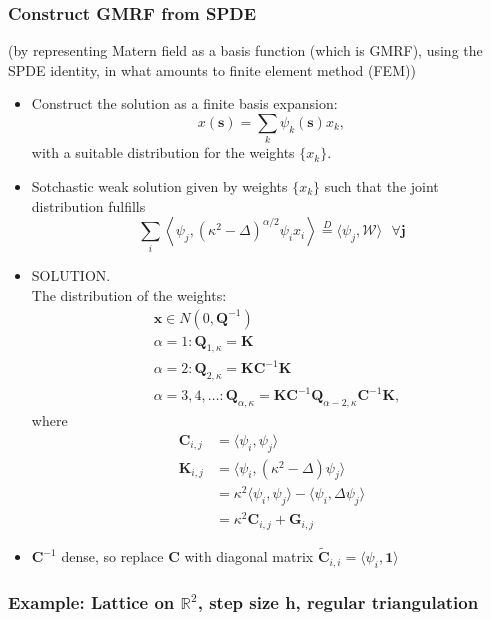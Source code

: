 \documentclass{article}
\begin{document}
\subsubsection*{Construct GMRF from SPDE}
(by representing Matern field as a basis function (which is GMRF), using the SPDE identity, in what amounts to finite element method (FEM))
      \begin{itemize}
      \item Construct the solution as a finite basis expansion:
      $$ x(\pmb{s}) = \sum_{k} \psi_{k}(\pmb{s})x_{k},$$ 
      with a suitable distribution for the weights $\{x_{k}\}$.
      \item Sotchastic weak solution given by weights $\{x_{k}\}$ such that the joint distribution fulfills
      $$ \sum_{i} \left< \psi_{j}, (\kappa^{2} - \Delta)^{\alpha/2} \psi_{i} x_{i} \right> \overset{D}{=} \langle \psi_{j}, \mathcal{W} \rangle \text{  } \forall \pmb{j}$$
      \item SOLUTION. \\The distribution of the weights:
      \begin{align}
      & \pmb{x} \in N(0, \pmb{Q}^{-1}) \\
      & \alpha = 1: \pmb{Q}_{1,\kappa} = \pmb{K} \\
      & \alpha = 2: \pmb{Q}_{2,\kappa} = \pmb{K} \pmb{C}^{-1} \pmb{K}  \\
      & \alpha = 3, 4, \hdots : \pmb{Q}_{\alpha,\kappa} = \pmb{K} \pmb{C}^{-1} \pmb{Q}_{\alpha - 2,\kappa} \pmb{C}^{-1} \pmb{K},  
      \end{align}
      where
      \begin{align}
      \pmb{C}_{i,j} & = \langle \psi_{i}, \psi_{j} \rangle \\
      \pmb{K}_{i,j} & = \langle \psi_{i}, (\kappa^{2} - \Delta)\psi_{j} \rangle \\
      & = \kappa^{2} \langle \psi_{i}, \psi_{j} \rangle - \langle \psi_{i}, \Delta \psi_{j} \rangle \\
      & = \kappa^{2} \pmb{C}_{i,j} + \pmb{G}_{i,j}
      \end{align}
      \item $\pmb{C}^{-1}$ dense, so replace $\pmb{C}$ with diagonal matrix $\widetilde{\pmb{C}}_{i,i} = \langle \psi_{i}, \pmb{1} \rangle$
      \end{itemize}
\subsubsection*{Example: Lattice on $\mathbb{R}^{2}$, step size h, regular triangulation}
\end{document}
